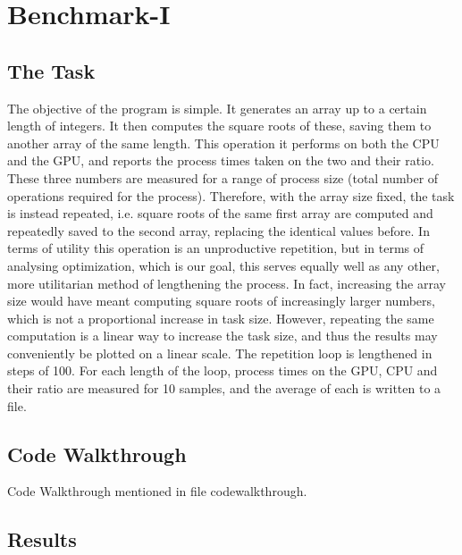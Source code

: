 \chapter{Benchmark-I}

\section{The Task}
The objective of the program is simple. It generates an array up to a certain length of integers. It then computes the square roots of these, saving them to another array of the same length. This operation it performs on both the CPU and the GPU, and reports the process times taken on the two and their ratio. These three numbers are measured for a range of process size (total number of operations required for the process).
Therefore, with the array size fixed, the task is instead repeated, i.e. square roots of the same first array are computed and repeatedly saved to the second array, replacing the identical values before. In terms of utility this operation is an unproductive repetition, but in terms of analysing optimization, which is our goal, this serves equally well as any other, more utilitarian method of lengthening the process. In fact, increasing the array size would have meant computing square roots of increasingly larger numbers, which is not a proportional
increase in task size. However, repeating the same computation is a linear way to increase the task size, and thus the results may conveniently be plotted on a linear scale. The repetition loop is lengthened in steps of 100. For each length of the loop, process times on the GPU, CPU and their ratio are measured for 10 samples, and the average of each is written to a file.

\section{Code Walkthrough}
Code Walkthrough mentioned in file codewalkthrough.

\section{Results}

